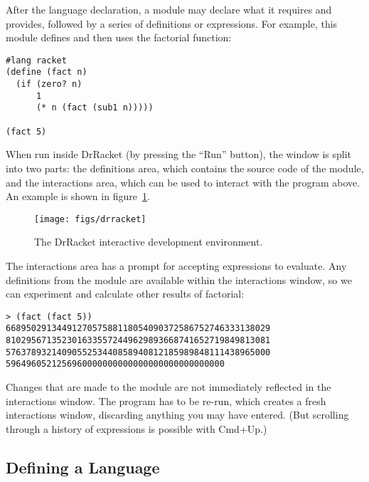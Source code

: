 After the language declaration, a module may declare what it requires
and provides, followed by a series of definitions or expressions.
For example, this module defines and then uses the factorial function:
\begin{verbatim}
#lang racket
(define (fact n)
  (if (zero? n)
      1
      (* n (fact (sub1 n)))))

(fact 5)
\end{verbatim}

When run inside DrRacket (by pressing the ``Run'' button), the window
is split into two parts: the definitions area, which contains the
source code of the module, and the interactions area, which can be
used to interact with the program above.  An example is shown in
figure~\ref{fig:drracket}.
\begin{figure}
\begin{center}
\texttt{[image: figs/drracket]}
\end{center}
\caption{The DrRacket interactive development environment.}
\label{fig:drracket}
\end{figure}


The interactions area has a prompt for accepting expressions to
evaluate.  Any definitions from the module are available within the
interactions window, so we can experiment and calculate other results
of factorial:
\begin{verbatim}
> (fact (fact 5))
6689502913449127057588118054090372586752746333138029
8102956713523016335572449629893668741652719849813081
5763789321409055253440858940812185989848111438965000
5964960521256960000000000000000000000000000
\end{verbatim}

Changes that are made to the module are not immediately reflected in
the interactions window.  The program has to be re-run, which creates
a fresh interactions window, discarding anything you may have entered.
(But scrolling through a history of expressions is possible with
Cmd+Up.)



\subsection{Defining a Language}

